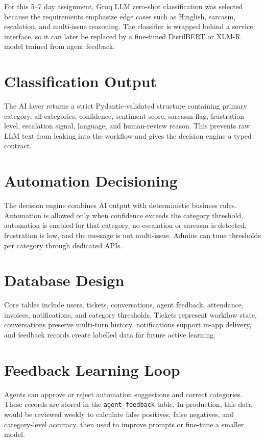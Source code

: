 ﻿\documentclass[11pt,a4paper]{article}
\begin{document}
For this 5--7 day assignment, Groq LLM zero-shot classification was selected because the requirements emphasize edge cases such as Hinglish, sarcasm, escalation, and multi-issue reasoning. The classifier is wrapped behind a service interface, so it can later be replaced by a fine-tuned DistilBERT or XLM-R model trained from agent feedback.

\section{Classification Output}
The AI layer returns a strict Pydantic-validated structure containing primary category, all categories, confidence, sentiment score, sarcasm flag, frustration level, escalation signal, language, and human-review reason. This prevents raw LLM text from leaking into the workflow and gives the decision engine a typed contract.

\section{Automation Decisioning}
The decision engine combines AI output with deterministic business rules. Automation is allowed only when confidence exceeds the category threshold, automation is enabled for that category, no escalation or sarcasm is detected, frustration is low, and the message is not multi-issue. Admins can tune thresholds per category through dedicated APIs.

\section{Database Design}
Core tables include users, tickets, conversations, agent feedback, attendance, invoices, notifications, and category thresholds. Tickets represent workflow state, conversations preserve multi-turn history, notifications support in-app delivery, and feedback records create labelled data for future active learning.

\section{Feedback Learning Loop}
Agents can approve or reject automation suggestions and correct categories. These records are stored in the \texttt{agent\_feedback} table. In production, this data would be reviewed weekly to calculate false positives, false negatives, and category-level accuracy, then used to improve prompts or fine-tune a smaller model.
\end{document}
